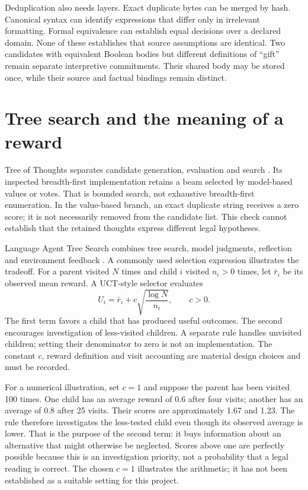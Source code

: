 \documentclass[12pt,a4paper,oneside,openany]{book}
\begin{document}
Deduplication also needs layers. Exact duplicate bytes can be merged by hash.
Canonical syntax can identify expressions that differ only in irrelevant
formatting. Formal equivalence can establish equal decisions over a declared
domain. None of these establishes that source assumptions are identical. Two
candidates with equivalent Boolean bodies but different definitions of ``gift''
remain separate interpretive commitments. Their shared body may be stored once,
while their source and factual bindings remain distinct.

\section{Tree search and the meaning of a reward}
\label{merge:M05:07}


Tree of Thoughts separates candidate generation, evaluation and search
\citep[section 3]{treeofthoughts2023}. Its inspected breadth-first implementation
retains a beam selected by model-based values or votes. That is bounded search,
not exhaustive breadth-first enumeration. In the value-based branch,
an exact duplicate string receives a zero score; it is not necessarily
removed from the candidate list. This check cannot establish that the
retained thoughts express different legal hypotheses.

Language Agent Tree Search combines tree search, model judgments, reflection and
environment feedback \citep[sections 3.2--4 and appendix A]{lats2024}. A commonly
used selection expression illustrates the tradeoff. For a parent visited $N$
times and child $i$ visited $n_i>0$ times, let $\bar r_i$ be its observed mean
reward. A UCT-style selector evaluates
\begin{equation}
 U_i=\bar r_i+c\sqrt{\frac{\log N}{n_i}},\qquad c>0.
 \label{eq:uct}
\end{equation}
The first term favors a child that has produced useful outcomes. The second
encourages investigation of less-visited children. A separate rule handles
unvisited children; setting their denominator to zero is not an implementation.
The constant $c$, reward definition and visit accounting are material design
choices and must be recorded.

For a numerical illustration, set $c=1$ and suppose the parent has been visited
100 times. One child has an average reward of 0.6 after four visits; another has
an average of 0.8 after 25 visits. Their scores are approximately 1.67 and 1.23.
The rule therefore investigates the less-tested child even though its observed
average is lower. That is the purpose of the second term: it buys information
about an alternative that might otherwise be neglected. Scores above one are
perfectly possible because this is an investigation priority, not a probability
that a legal reading is correct. The chosen $c=1$ illustrates the arithmetic;
it has not been established as a suitable setting for this project.
\end{document}
